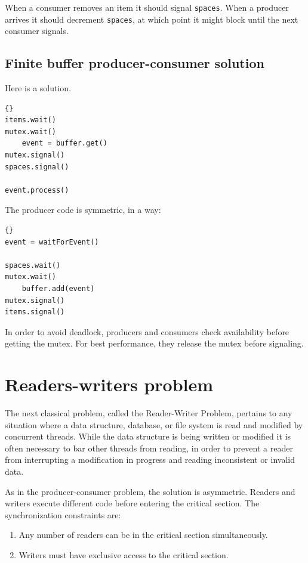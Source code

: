 \documentclass{book}
\begin{document}
When a consumer removes an item it should signal {\tt spaces}.
When a producer arrives it should decrement {\tt spaces}, at
which point it might block until the next consumer signals.



\subsection{Finite buffer producer-consumer solution}

Here is a solution.

\begin{lstlisting}[title={Finite buffer consumer solution}]{}
items.wait()
mutex.wait()
    event = buffer.get()
mutex.signal()
spaces.signal()

event.process()
\end{lstlisting}

The producer code is symmetric, in a way:

\begin{lstlisting}[title={Finite buffer producer solution}]{}
event = waitForEvent()

spaces.wait()
mutex.wait()
    buffer.add(event)
mutex.signal()
items.signal()
\end{lstlisting}

In order to avoid deadlock, producers and consumers check
availability before getting the mutex.  For best performance,
they release the mutex before signaling.


\section{Readers-writers problem}

The next classical problem, called the Reader-Writer Problem, pertains
to any situation where a data structure, database, or file system is
read and modified by concurrent threads.  While the data structure is
being written or modified it is often necessary to bar other threads
from reading, in order to prevent a reader from interrupting a
modification in progress and reading inconsistent or invalid data.

As in the producer-consumer problem, the solution is asymmetric.
Readers and writers execute different code before entering the
critical section.  The synchronization constraints are:

\begin{enumerate}

    \item Any number of readers can be in the critical section
          simultaneously.

    \item Writers must have exclusive access to the critical section.

\end{enumerate}
\end{document}
